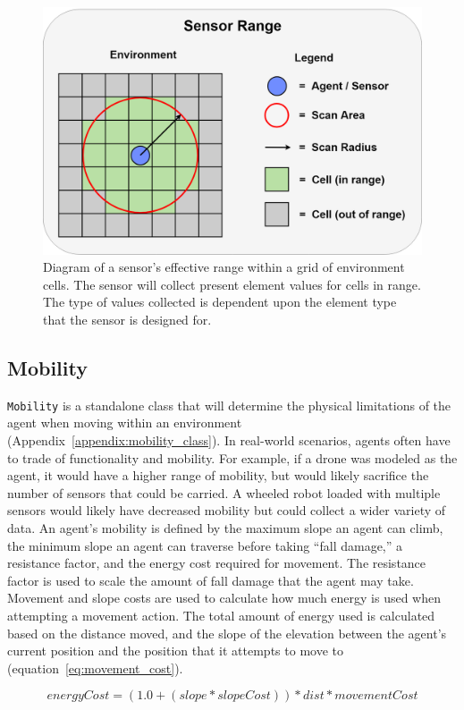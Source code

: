 \begin{figure}[H]
  \centering
  \includegraphics[width=0.70\columnwidth]{Figures/sensor_range.png}
  \caption{Diagram of a sensor's effective range within a grid of environment cells. The sensor will collect present element values for cells in range. The type of values collected is dependent upon the element type that the sensor is designed for.}
  \label{fig:sensor_range}
\end{figure}


\subsection{Mobility} \label{subsec:mobility}
\texttt{Mobility} is a standalone class  that will determine the physical limitations of the agent when moving within an environment (Appendix~\ref{appendix:mobility_class}).
In real-world scenarios, agents often have to trade of functionality and mobility.
For example, if a drone was modeled as the agent, it would have a higher range of mobility, but would likely sacrifice the number of sensors that could be carried.
A wheeled robot loaded with multiple sensors would likely have decreased mobility but could collect a wider variety of data.
An agent's mobility is defined by the maximum slope an agent can climb, the minimum slope an agent can traverse before taking ``fall damage,'' a resistance factor, and the energy cost required for movement.
The resistance factor is used to scale the amount of fall damage that the agent may take.
Movement and slope costs are used to calculate how much energy is used when attempting a movement action.
The total amount of energy used is calculated based on the distance moved, and the slope of the elevation between the agent's current position and the position that it attempts to move to (equation~\ref{eq:movement_cost}).

\begin{capeq}[H]
  \begin{equation} \label{eq:movement_cost}
    energyCost = (1.0 + (slope * slopeCost)) * dist * movementCost
  \end{equation}
  \caption{Equation to calculate the energy required for an agent to move within an environment. This is based on the agent's $movementCost$ and $slopeCost$, and the physical $slope$ and $distance$ that is traveled.}
\end{capeq}


